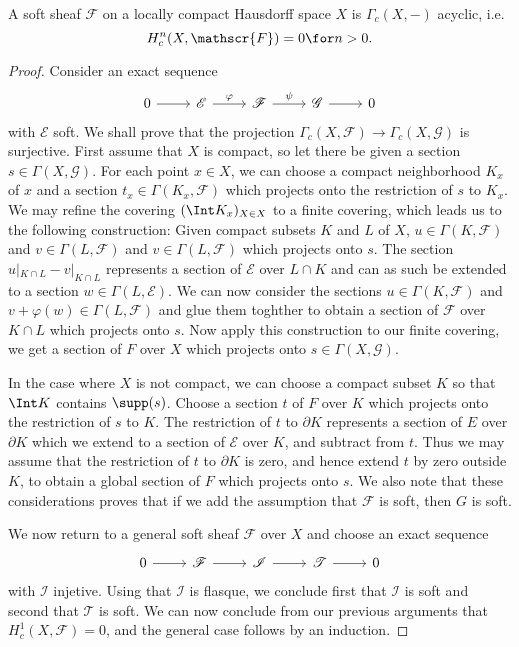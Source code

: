 \begin{theorem}\label{sheaf on LHS soft is compact acyclic}
A soft sheaf $\mathscr{F}$ on a locally compact Hausdorff space $X$ is $\Gamma_c(X,-)$ acyclic, i.e.
\[H^n_c(X,\mathscr{F})=0\for n>0.\]
\end{theorem}
\begin{proof}
Consider an exact sequence
\[\begin{tikzcd}
0\ar[r]&\mathscr{E}\ar[r,"\varphi"]&\mathscr{F}\ar[r,"\psi"]&\mathscr{G}\ar[r]&0
\end{tikzcd}\]
with $\mathscr{E}$ soft. We shall prove that the projection $\Gamma_c(X,\mathscr{F})\to\Gamma_c(X,\mathscr{G})$ is surjective. First assume that $X$ is compact, so let there be given a section $s\in\Gamma(X,\mathscr{G})$. For each point $x\in X$, we can choose a compact neighborhood $K_x$ of $x$ and a section $t_x\in\Gamma(K_x,\mathscr{F})$ which projects onto the restriction of $s$ to $K_x$. We may refine the covering $(\Int K_x)_{X\in X}$ to a finite covering, which leads us to the following construction: Given compact subsets $K$ and $L$ of $X$, $u\in\Gamma(K,\mathscr{F})$ and $v\in\Gamma(L,\mathscr{F})$ and $v\in\Gamma(L,\mathscr{F})$ which projects onto $s$. The section $u|_{K\cap L}-v|_{K\cap L}$ represents a section of $\mathscr{E}$ over $L\cap K$ and can as such be extended to a section $w\in\Gamma(L,\mathscr{E})$. We can now consider the sections $u\in\Gamma(K,\mathscr{F})$ and $v+\varphi(w)\in\Gamma(L,\mathscr{F})$ and glue them toghther to obtain a section of $\mathscr{F}$ over $K\cap L$ which projects onto $s$. Now apply this construction to our finite covering, we get a section of $F$ over $X$ which projects onto $s\in\Gamma(X,\mathscr{G})$.\par
In the case where $X$ is not compact, we can choose a compact subset $K$ so that $\Int K$ contains $\supp(s)$. Choose a section $t$ of $F$ over $K$ which projects onto the restriction of $s$ to $K$. The restriction of $t$ to $\partial K$ represents a section of $E$ over $\partial K$ which we extend to a section of $\mathscr{E}$ over $K$, and subtract from $t$. Thus we may assume that the restriction of $t$ to $\partial K$ is zero, and hence extend $t$ by zero outside $K$, to obtain a global section of $F$ which projects onto $s$. We also note that these considerations proves that if we add the assumption that $\mathscr{F}$ is soft, then $G$ is soft.\par
We now return to a general soft sheaf $\mathscr{F}$ over $X$ and choose an exact sequence
\[\begin{tikzcd}
0\ar[r]&\mathscr{F}\ar[r]&\mathscr{I}\ar[r]&\mathscr{T}\ar[r]&0
\end{tikzcd}\]
with $\mathscr{I}$ injetive. Using that $\mathscr{I}$ is flasque, we conclude first that $\mathscr{I}$ is soft and second that $\mathscr{T}$ is soft. We can now conclude from our previous arguments that $H_c^1(X,\mathscr{F})=0$, and the general case follows by an induction.
\end{proof}

